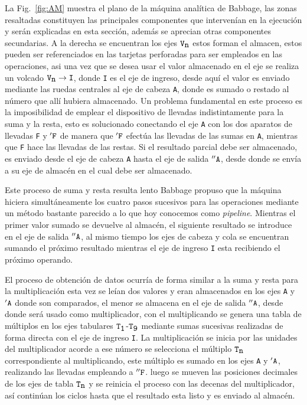 \documentclass[runningheads,a4paper]{llncs}
\begin{document}
La Fig.~\ref{fig:AM} muestra el plano de la máquina analítica de Babbage, las zonas resaltadas constituyen las principales componentes que intervenían en la ejecución y serán explicadas en esta sección, además se aprecian otras componentes secundarias. A la derecha se encuentran los ejes $\verb*|V|_{\verb*|n|}$ estos forman el almacen, estos pueden ser referenciados en las tarjetas perforadas para ser empleados en las operaciones, asi una vez que se desea usar el valor almacenado en el eje se realiza un volcado $\verb*|V|_{\verb*|n|} \rightarrow  \verb*|I|$, donde \verb*|I| es el eje de ingreso, desde aquí el valor es enviado mediante las ruedas centrales al eje de cabeza \verb*|A|, donde es sumado o restado al número que allí hubiera almacenado. Un problema fundamental en este proceso es la imposibilidad de emplear el dispositivo de llevadas indistintamente para la suma y la resta, esto es solucionado conectando el eje \verb*|A| con los dos aparatos de llevadas \verb*|F| y $'\verb*|F|$ de manera que $'\verb*|F|$ efectúa las llevadas de las sumas en \verb*|A|, mientras que \verb*|F| hace las llevadas de las restas. Si el resultado parcial debe ser almacenado, es enviado desde el eje de cabeza \verb*|A| hasta el eje de salida $''\verb*|A|$, desde donde se envía a su eje de almacén en el cual debe ser almacenado. 

Este proceso de suma y resta resulta lento Babbage propuso que la máquina hiciera simultáneamente los cuatro pasos sucesivos para las operaciones mediante un método bastante parecido a lo que hoy conocemos como \emph{pipeline}. Mientras el primer valor sumado se devuelve al almacén, el siguiente resultado se introduce en el eje de salida $''\verb*|A|$, al mismo tiempo los ejes de cabeza y cola se encuentran sumando el próximo resultado mientras el eje de ingreso \verb*|I| esta recibiendo el próximo operando.

El proceso de obtención de datos ocurría de forma similar a la suma y resta para la multiplicación esta vez se leían dos
valores y eran almacenados en los ejes \verb*|A| y $'\verb*|A|$ donde son comparados, el menor se almacena en el eje de 
salida $''\verb*|A|$, desde donde será usado como multiplicador, con el multiplicando se genera una tabla de múltiplos 
en los ejes tabulares $\verb*|T|_{\verb*|1|}$-$\verb*|T|_{\verb*|9|}$ mediante sumas sucesivas realizadas de forma directa con el eje de ingreso 
\verb*|I|. La multiplicación se inicia por las unidades del multiplicador acorde a ese número se selecciona el múltiplo $\verb*|T|_{\verb*|n|}$ correspondiente al multiplicando, este múltiplo es sumado en los ejes \verb*|A| y $'\verb*|A|$, realizando las llevadas empleando a $''\verb*|F|$. luego se mueven las posiciones decimales de los ejes de tabla $\verb*|T|_{\verb*|n|}$ y se reinicia el proceso con las decenas del multiplicador, así continúan los ciclos hasta que el resultado esta listo y es enviado al 
almacén.
\newpage
\end{document}

